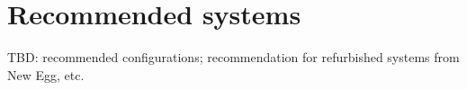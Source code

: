 \section{Recommended systems}

TBD: recommended configurations; recommendation for refurbished systems from New Egg, etc.
